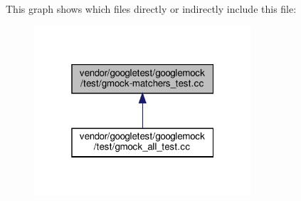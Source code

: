 This graph shows which files directly or indirectly include this file\+:
\nopagebreak
\begin{figure}[H]
\begin{center}
\leavevmode
\includegraphics[width=229pt]{gmock-matchers__test_8cc__dep__incl}
\end{center}
\end{figure}
